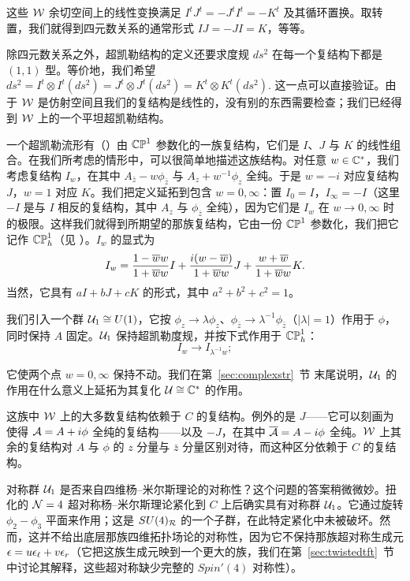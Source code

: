 这些 $\EUW$ 余切空间上的线性变换满足 $I^tJ^t=-J^tI^t=-K^t$ 及其循环置换。取转置，我们就得到四元数关系的通常形式 $IJ=-JI=K$，等等。

除四元数关系之外，超凯勒结构的定义还要求度规 $ds^2$ 在每一个复结构下都是 $(1,1)$ 型。等价地，我们希望 $ds^2=I^t\otimes I^t(ds^2)=J^t\otimes J^t(ds^2)=K^t\otimes K^t(ds^2).$ 这一点可以直接验证。由于 $\EUW$ 是仿射空间且我们的复结构是线性的，没有别的东西需要检查；我们已经得到 $\EUW$ 上的一个平坦超凯勒结构。

一个超凯勒流形有（\xunko）由 $\Bbb{CP}^1$ 参数化的一族复结构，它们是 $I$、$J$ 与 $K$ 的线性组合。在我们所考虑的情形中，可以很简单地描述这族结构。对任意 $w\in \Bbb{C}^*$，我们考虑复结构 $I_w$，在其中 $A_{\bar z}-w\phi_{\bar z}$ 与 $A_z+w^{-1}\phi_z$ 全纯。于是 $w=-i$ 对应复结构 $J$，$w=1$ 对应 $K$。我们把定义延拓到包含 $w=0,\infty$：置 $I_0=I$，$I_\infty=-I$（这里 $-I$ 是与 $I$ 相反的复结构，其中 $A_z$ 与 $\phi_{\bar z}$ 全纯），因为它们是 $I_w$ 在 $w\to 0,\infty$ 时的极限。这样我们就得到所期望的那族复结构，它由一份 $\Bbb{CP}^1$ 参数化，我们把它记作 $\Bbb{CP}^1_h$（见 \zunko）。$I_w$ 的显式为
\setcounter{equation}{5}
\begin{equation}\label{eq:wyre}
I_w={1-\bar w w\over 1+\bar w w}I+{i(w-\bar w)\over
1+\bar w w}J+{w+\bar w\over 1+\bar w w}K.
\end{equation}
当然，它具有 $aI+bJ+cK$ 的形式，其中 $a^2+b^2+c^2=1$。

\providecommand{\CU}{{\cal U}}
我们引入一个群 $\CU_1\cong U(1)$，它按 $\phi_z\to \lambda\phi_z$、$\phi_{\bar z}\to \lambda^{-1}\phi_{\bar z}$（$|\lambda|=1$）作用于 $\phi$，同时保持 $A$ 固定。$\CU_1$ 保持超凯勒度规，并按下式作用于 $\Bbb{CP}^1_h$：%
\setcounter{equation}{6}
\begin{equation}\label{eq:zungo}
I_w\to I_{\lambda^{-1}w};
\end{equation}

它使两个点 $w=0,\infty$ 保持不动。我们在第~\ref{sec:complexstr}~节 末尾说明，$\CU_1$ 的作用在什么意义上延拓为其复化 $\CU\cong \Bbb{C}^*$ 的作用。

这族中 $\EUW$ 上的大多数复结构依赖于 $C$ 的复结构。例外的是 $J$——它可以刻画为使得 $\CA=A+i\phi$ 全纯的复结构——以及 $-J$，在其中 $\bar\CA=A-i\phi$ 全纯。$\EUW$ 上其余的复结构对 $A$ 与 $\phi$ 的 $z$ 分量与 $\bar z$ 分量区别对待，而这种区分依赖于 $C$ 的复结构。

对称群 ${\cal U}_1$ 是否来自四维杨--米尔斯理论的对称性？这个问题的答案稍微微妙。扭化的 ${\EUN}=4$ 超对称杨--米尔斯理论紧化到 $C$ 上后确实具有对称群 $\CU_1$。它通过旋转 $\phi_2-\phi_3$ 平面来作用；这是 $SU(4)_{\cal R}$ 的一个子群，在此特定紧化中未被破坏。然而，这并不给出底层那族四维拓扑场论的对称性，因为它不保持那族超对称生成元 $\epsilon=u\epsilon_\ell+v\epsilon_\rr$（它把这族生成元映到一个更大的族，我们在第~\ref{sec:twistedtft}~节 中讨论其解释，这些超对称缺少完整的 $Spin'(4)$ 对称性）。

